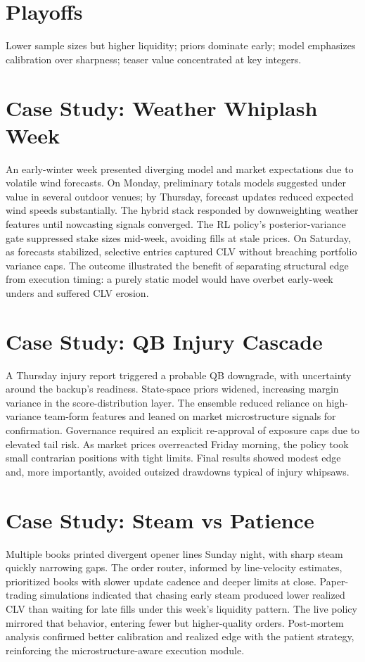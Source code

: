 \documentclass[12pt]{report}  %
\numberwithin{equation}{section}
\theoremstyle{plain}
\theoremstyle{definition}
\theoremstyle{remark}
\begin{document}
\section{Playoffs}
Lower sample sizes but higher liquidity; priors dominate early; model emphasizes calibration over sharpness; teaser value concentrated at key integers.

\section{Case Study: Weather Whiplash Week}
An early-winter week presented diverging model and market expectations due to volatile wind forecasts. On Monday, preliminary totals models suggested under value in several outdoor venues; by Thursday, forecast updates reduced expected wind speeds substantially. The hybrid stack responded by downweighting weather features until nowcasting signals converged. The RL policy’s posterior-variance gate suppressed stake sizes mid-week, avoiding fills at stale prices. On Saturday, as forecasts stabilized, selective entries captured CLV without breaching portfolio variance caps. The outcome illustrated the benefit of separating structural edge from execution timing: a purely static model would have overbet early-week unders and suffered CLV erosion.

\section{Case Study: QB Injury Cascade}
A Thursday injury report triggered a probable QB downgrade, with uncertainty around the backup’s readiness. State-space priors widened, increasing margin variance in the score-distribution layer. The ensemble reduced reliance on high-variance team-form features and leaned on market microstructure signals for confirmation. Governance required an explicit re-approval of exposure caps due to elevated tail risk. As market prices overreacted Friday morning, the policy took small contrarian positions with tight limits. Final results showed modest edge and, more importantly, avoided outsized drawdowns typical of injury whipsaws.

\section{Case Study: Steam vs Patience}
Multiple books printed divergent opener lines Sunday night, with sharp steam quickly narrowing gaps. The order router, informed by line-velocity estimates, prioritized books with slower update cadence and deeper limits at close. Paper-trading simulations indicated that chasing early steam produced lower realized CLV than waiting for late fills under this week’s liquidity pattern. The live policy mirrored that behavior, entering fewer but higher-quality orders. Post-mortem analysis confirmed better calibration and realized edge with the patient strategy, reinforcing the microstructure-aware execution module.
\end{document}
